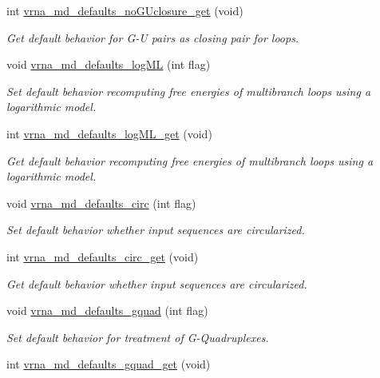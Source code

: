 \begin{DoxyCompactItemize}
int \hyperlink{group__model__details_ga4f7fdad083243a5348d63320ddaa70f3}{vrna\-\_\-md\-\_\-defaults\-\_\-no\-G\-Uclosure\-\_\-get} (void)
\begin{DoxyCompactList}\small\item\em Get default behavior for G-\/\-U pairs as closing pair for loops. \end{DoxyCompactList}\item 
void \hyperlink{group__model__details_ga3de50a73455d88c3957386933b8e1f90}{vrna\-\_\-md\-\_\-defaults\-\_\-log\-M\-L} (int flag)
\begin{DoxyCompactList}\small\item\em Set default behavior recomputing free energies of multibranch loops using a logarithmic model. \end{DoxyCompactList}\item 
int \hyperlink{group__model__details_ga93f04e070d529c5d0bb87c9681f6ad29}{vrna\-\_\-md\-\_\-defaults\-\_\-log\-M\-L\-\_\-get} (void)
\begin{DoxyCompactList}\small\item\em Get default behavior recomputing free energies of multibranch loops using a logarithmic model. \end{DoxyCompactList}\item 
void \hyperlink{group__model__details_ga4e1deb3e91a8a99e5c6dd905a5eb0186}{vrna\-\_\-md\-\_\-defaults\-\_\-circ} (int flag)
\begin{DoxyCompactList}\small\item\em Set default behavior whether input sequences are circularized. \end{DoxyCompactList}\item 
int \hyperlink{group__model__details_gad3a7e58de344ad93a08925f58f94f6fb}{vrna\-\_\-md\-\_\-defaults\-\_\-circ\-\_\-get} (void)
\begin{DoxyCompactList}\small\item\em Get default behavior whether input sequences are circularized. \end{DoxyCompactList}\item 
void \hyperlink{group__model__details_ga0685ca2aeb39af76f2421fc308163dce}{vrna\-\_\-md\-\_\-defaults\-\_\-gquad} (int flag)
\begin{DoxyCompactList}\small\item\em Set default behavior for treatment of G-\/\-Quadruplexes. \end{DoxyCompactList}\item 
int \hyperlink{group__model__details_gae645b8612f879eb38b45244fa9eddb9e}{vrna\-\_\-md\-\_\-defaults\-\_\-gquad\-\_\-get} (void)

\end{DoxyCompactItemize}
